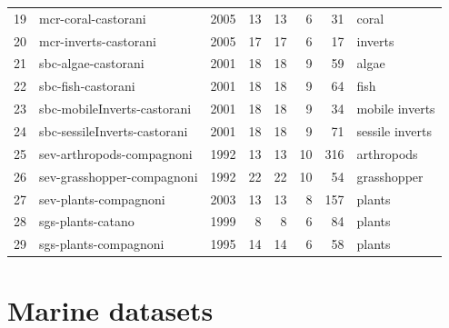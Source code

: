 \documentclass[11pt, oneside]{article}
\begin{document}
\begin{table}[ht]
\begin{tabular}{rlrrrrrl}
  19 & mcr-coral-castorani & 2005 &  13 &  13 &   6 &  31 & coral \\ 
  20 & mcr-inverts-castorani & 2005 &  17 &  17 &   6 &  17 & inverts \\ 
  21 & sbc-algae-castorani & 2001 &  18 &  18 &   9 &  59 & algae \\ 
  22 & sbc-fish-castorani & 2001 &  18 &  18 &   9 &  64 & fish \\ 
  23 & sbc-mobileInverts-castorani & 2001 &  18 &  18 &   9 &  34 & mobile inverts \\ 
  24 & sbc-sessileInverts-castorani & 2001 &  18 &  18 &   9 &  71 & sessile inverts \\ 
  25 & sev-arthropods-compagnoni & 1992 &  13 &  13 &  10 & 316 & arthropods \\ 
  26 & sev-grasshopper-compagnoni & 1992 &  22 &  22 &  10 &  54 & grasshopper \\ 
  27 & sev-plants-compagnoni & 2003 &  13 &  13 &   8 & 157 & plants \\ 
  28 & sgs-plants-catano & 1999 &   8 &   8 &   6 &  84 & plants \\ 
  29 & sgs-plants-compagnoni & 1995 &  14 &  14 &   6 &  58 & plants \\ 
   \hline
\end{tabular}
 \label{metadata} 
\end{table}

%


\section {Marine datasets}
\end{document}

